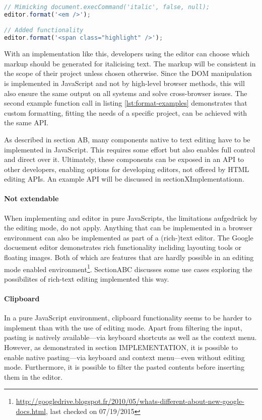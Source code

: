 \begin{lstlisting}[language=JavaScript, caption=Example calls to format text, label=lst:format-examples]
// Mimicking document.execCommand('italic', false, null);
editor.format('<em />');

// Added functionality
editor.format('<span class="highlight" />');
\end{lstlisting}

With an implementation like this, developers using the editor can choose which markup should be generated for italicising text. The markup will be consistent in the scope of their project unless chosen otherwise. Since the DOM manipulation is implemented in JavaScript and not by high-level browser methods, this will also ensure the same output on all systems and solve cross-browser issues. The second example function call in listing \ref{lst:format-examples} demonstrates that custom formatting, fitting the needs of a specific project, can be achieved with the same API.

As described in section AB, many components native to text editing have to be implemented in JavaScript. This requires some effort but also enables full control and direct over it. Ultimately, these components can be exposed in an API to other developers, enabling options for developing editors, not offered by HTML editing APIs. An example API will be discussed in sectionXImplementationn.

\paragraph{Not extendable} When implementing and editor in pure JavaScripts, the limitations aufgedrück by the editing mode, do not apply. Anything that can be implemented in a browser environment can also be implemented as part of a (rich-)text editor. The Google docuement editor demonstrates rich functionality incliding layouting tools or floating images. Both of which are features that are hardly possible in an editing mode enabled environment\footnote{\url{http://googledrive.blogspot.fr/2010/05/whats-different-about-new-google-docs.html}, last checked on 07/19/2015}. SectionABC discusses some use cases exploring the possibilites of rich-text editing implemented this way. %

\paragraph{Clipboard} In a pure JavaScript environment, clipboard functionality seems to be harder to implement than with the use of editing mode. Apart from filtering the input, pasting is natively available---via keyboard shortcuts as well as the context menu. However, as demonstrated in section IMPLEMENTATION, it is possible to enable native pasting---via keyboard and context menu---even without editing mode. Furthermore, it is possible to filter the pasted contents before inserting them in the editor.


